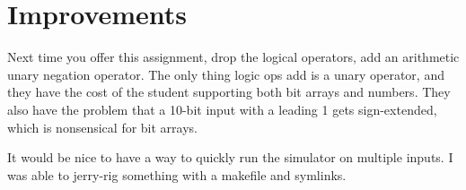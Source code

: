 \documentclass{article}
\begin{document}
\section{Improvements}
Next time you offer this assignment, drop the logical operators, add an arithmetic unary negation operator.
The only thing logic ops add is a unary operator, and they have the cost of the student supporting both bit arrays and numbers.
They also have the problem that a 10-bit input with a leading 1 gets sign-extended, which is nonsensical for bit arrays.

It would be nice to have a way to quickly run the simulator on multiple inputs.
I was able to jerry-rig something with a makefile and symlinks.
\end{document}
